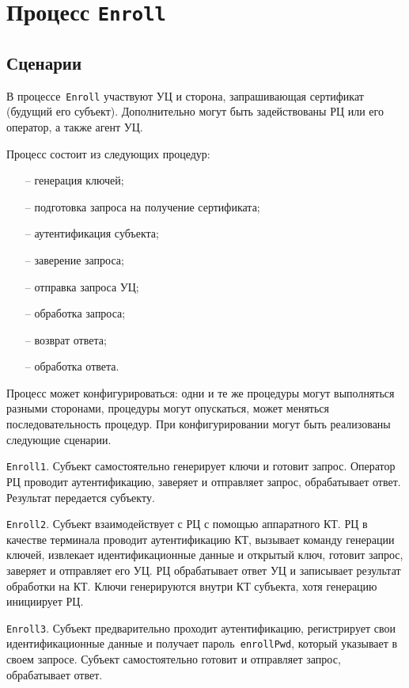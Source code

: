 \section{Процесс \texttt{Enroll}}\label{PROCESSES.Enroll}

\subsection{Сценарии}\label{PROCESSES.Enroll.List}

В процессе~\texttt{Enroll} участвуют УЦ и сторона, запрашивающая 
сертификат (будущий его субъект). Дополнительно могут быть задействованы
РЦ или его оператор, а также агент УЦ. 

Процесс состоит из следующих процедур:
\begin{itemize}
\item[--]
генерация ключей;
\item[--]
подготовка запроса на получение сертификата;
\item[--]
аутентификация субъекта;
\item[--]
заверение запроса;
\item[--]
отправка запроса УЦ;
\item[--]
обработка запроса;
\item[--]
возврат ответа;
\item[--]
обработка ответа.
\end{itemize}

Процесс может конфигурироваться: 
одни и те же процедуры могут выполняться разными сторонами,
процедуры могут опускаться, может меняться последовательность 
процедур. При конфигурировании могут быть реализованы следующие сценарии.

\texttt{Enroll1}. 
Субъект самостоятельно генерирует ключи и готовит запрос.
Оператор РЦ проводит аутентификацию, заверяет и отправляет запрос, 
обрабатывает ответ. Результат передается субъекту.

\texttt{Enroll2}. 
Субъект взаимодействует с РЦ с помощью аппаратного КТ. РЦ в качестве 
терминала проводит аутентификацию КТ, вызывает команду генерации ключей,
извлекает идентификационные данные и открытый ключ, готовит запрос, 
заверяет и отправляет его УЦ. РЦ обрабатывает ответ УЦ и записывает 
результат обработки на КТ. Ключи генерируются внутри КТ субъекта,
хотя генерацию инициирует РЦ.

\texttt{Enroll3}.
Субъект предварительно проходит аутентификацию, регистрирует свои 
идентификационные данные и получает пароль~\texttt{enrollPwd}, 
который указывает в своем запросе. Субъект самостоятельно готовит и 
отправляет запрос, обрабатывает ответ.

